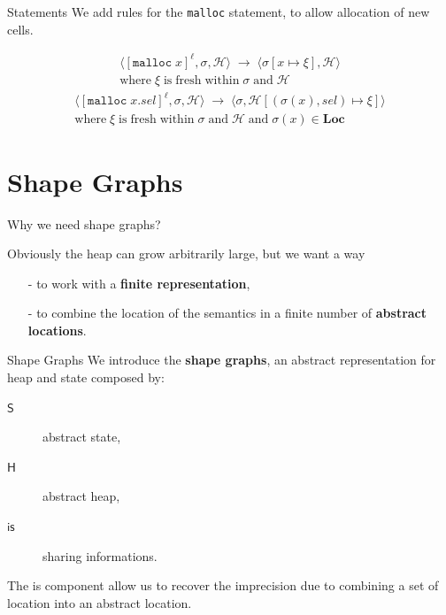 \documentclass[xcolor=svgnames,11pt]{beamer}
\begin{document}
\begin{frame}{Statements}
We add rules for the \texttt{malloc} statement, to allow allocation of new cells.

$$
\begin{array}{cc}
\langle[\mathtt{malloc}\; x]^\ell,\sigma,\mathcal{H}\rangle \;\rightarrow\; \langle \sigma[x \mapsto \xi], \mathcal{H} \rangle
\\
\mathrm{where}\; \xi \;\mathrm{is\;fresh\;within\;} \sigma \;\mathrm{and}\; \mathcal{H}
\end{array}
$$
\pause
$$
\begin{array}{cc}
\langle[\mathtt{malloc}\; x.sel]^\ell,\sigma,\mathcal{H}\rangle \;\rightarrow\; \langle \sigma, \mathcal{H}[(\sigma(x),sel) \mapsto \xi] \rangle
\\
\mathrm{where}\; \xi \;\mathrm{is\;fresh\;within\;} \sigma \;\mathrm{and}\; \mathcal{H} \;\mathrm{and}\; \sigma(x) \in \mathbf{Loc}
\end{array}
$$
\end{frame}

\section{Shape Graphs}

\begin{frame}{Why we need shape graphs?}

Obviously the heap can grow arbitrarily large, but we want a way 

\begin{itemize}
	\item [-] to work with a \textbf{finite representation},
	\item [-] to combine the location of the semantics in a finite number of \textbf{abstract locations}.
\end{itemize}

\medskip
\pause
\begin{block}{Shape Graphs}
We introduce the \textbf{shape graphs}, an abstract representation for heap and state composed by:
\begin{description}
\item[$\mathsf{S}$] 	abstract state,
\item[$\mathsf{H}$] 	abstract heap,
\item[$\mathsf{is}$] 	sharing informations.
\end{description}
\end{block}

\medskip
\pause
The \textcolor{bl}{is} component allow us to recover the imprecision due to combining a set of location into an abstract location.

\end{frame}
\end{document}
